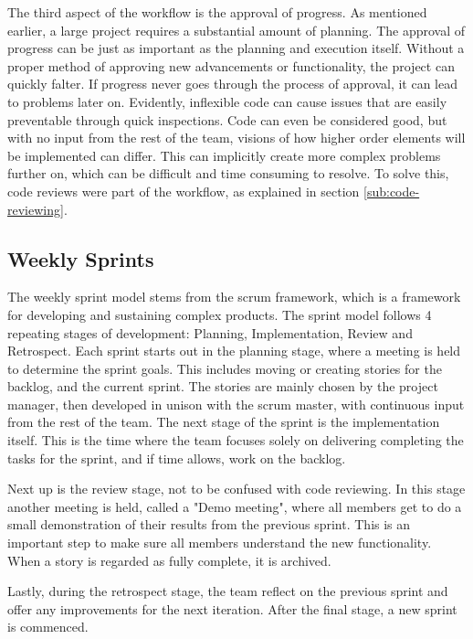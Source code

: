     The third aspect of the workflow is the approval of progress. As mentioned earlier, a large project requires a substantial amount of planning. The approval of progress can be just as important as the planning and execution itself. Without a proper method of approving new advancements or functionality, the project can quickly falter. If progress never goes through the process of approval, it can lead to problems later on. Evidently, inflexible code can cause issues that are easily preventable through quick inspections. Code can even be considered good, but with no input from the rest of the team, visions of how higher order elements will be implemented can differ. This can implicitly create  more complex problems further on, which can be difficult and time consuming to resolve. To solve this, code reviews were part of the workflow, as explained in section \ref{sub:code-reviewing}.

    \subsection{Weekly Sprints} \label{sub:weekly-sprints}
        The weekly sprint model stems from the scrum framework, which is a framework for developing and sustaining complex products. The sprint model follows 4 repeating stages of development: Planning, Implementation, Review and Retrospect. Each sprint starts out in the planning stage, where a meeting is held to determine the sprint goals. This includes moving or creating stories for the backlog, and the current sprint. The stories are mainly chosen by the project manager, then developed in unison with the scrum master, with continuous input from the rest of the team. The next stage of the sprint is the implementation itself. This is the time where the team focuses solely on delivering completing the tasks for the sprint, and if time allows, work on the backlog.
    
        Next up is the review stage, not to be confused with code reviewing. In this stage another meeting is held, called a "Demo meeting", where all members get to do a small demonstration of their results from the previous sprint. This is an important step to make sure all members understand the new functionality. When a story is regarded as fully complete, it is archived. 
        
        Lastly, during the retrospect stage, the team reflect on the previous sprint and offer any improvements for the next iteration. After the final stage, a new sprint is commenced.

